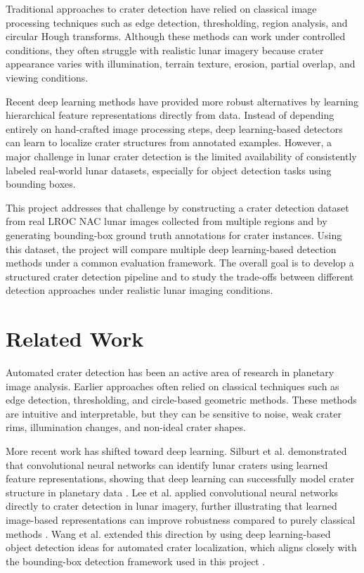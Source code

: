 \documentclass[conference]{IEEEtran}
\begin{document}
	Traditional approaches to crater detection have relied on classical image processing techniques such as edge detection, thresholding, region analysis, and circular Hough transforms. Although these methods can work under controlled conditions, they often struggle with realistic lunar imagery because crater appearance varies with illumination, terrain texture, erosion, partial overlap, and viewing conditions.
	
	Recent deep learning methods have provided more robust alternatives by learning hierarchical feature representations directly from data. Instead of depending entirely on hand-crafted image processing steps, deep learning-based detectors can learn to localize crater structures from annotated examples. However, a major challenge in lunar crater detection is the limited availability of consistently labeled real-world lunar datasets, especially for object detection tasks using bounding boxes.
	
	This project addresses that challenge by constructing a crater detection dataset from real LROC NAC lunar images collected from multiple regions and by generating bounding-box ground truth annotations for crater instances. Using this dataset, the project will compare multiple deep learning-based detection methods under a common evaluation framework. The overall goal is to develop a structured crater detection pipeline and to study the trade-offs between different detection approaches under realistic lunar imaging conditions.
	
	\section{Related Work}
	Automated crater detection has been an active area of research in planetary image analysis. Earlier approaches often relied on classical techniques such as edge detection, thresholding, and circle-based geometric methods. These methods are intuitive and interpretable, but they can be sensitive to noise, weak crater rims, illumination changes, and non-ideal crater shapes.
	
	More recent work has shifted toward deep learning. Silburt et al. demonstrated that convolutional neural networks can identify lunar craters using learned feature representations, showing that deep learning can successfully model crater structure in planetary data \cite{silburt2019lunar}. Lee et al. applied convolutional neural networks directly to crater detection in lunar imagery, further illustrating that learned image-based representations can improve robustness compared to purely classical methods \cite{lee2020crater}. Wang et al. extended this direction by using deep learning-based object detection ideas for automated crater localization, which aligns closely with the bounding-box detection framework used in this project \cite{wang2022crater}.
	
\end{document}
